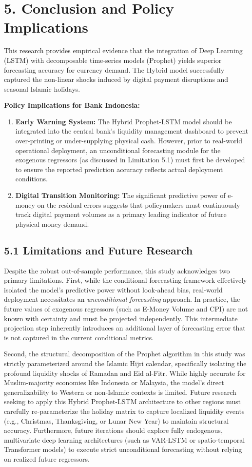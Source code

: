 \documentclass[12pt, letterpaper]{article}
\begin{document}
\section*{5. Conclusion and Policy Implications}
This research provides empirical evidence that the integration of Deep Learning (LSTM) with decomposable time-series models (Prophet) yields superior forecasting accuracy for currency demand. The Hybrid model successfully captured the non-linear shocks induced by digital payment disruptions and seasonal Islamic holidays. 

\textbf{Policy Implications for Bank Indonesia:}
\begin{enumerate}
    \item \textbf{Early Warning System:} The Hybrid Prophet-LSTM model should be integrated into the central bank's liquidity management dashboard to prevent over-printing or under-supplying physical cash. However, prior to real-world operational deployment, an unconditional forecasting module for the exogenous regressors (as discussed in Limitation 5.1) must first be developed to ensure the reported prediction accuracy reflects actual deployment conditions.
    \item \textbf{Digital Transition Monitoring:} The significant predictive power of e-money on the residual errors suggests that policymakers must continuously track digital payment volumes as a primary leading indicator of future physical money demand.
\end{enumerate}

\subsection*{5.1 Limitations and Future Research}
Despite the robust out-of-sample performance, this study acknowledges two primary limitations. First, while the conditional forecasting framework effectively isolated the model's predictive power without look-ahead bias, real-world deployment necessitates an \textit{unconditional forecasting} approach. In practice, the future values of exogenous regressors (such as E-Money Volume and CPI) are not known with certainty and must be projected independently. This intermediate projection step inherently introduces an additional layer of forecasting error that is not captured in the current conditional metrics.

Second, the structural decomposition of the Prophet algorithm in this study was strictly parameterized around the Islamic Hijri calendar, specifically isolating the profound liquidity shocks of Ramadan and Eid al-Fitr. While highly accurate for Muslim-majority economies like Indonesia or Malaysia, the model's direct generalizability to Western or non-Islamic contexts is limited. Future research seeking to apply this Hybrid Prophet-LSTM architecture to other regions must carefully re-parameterize the holiday matrix to capture localized liquidity events (e.g., Christmas, Thanksgiving, or Lunar New Year) to maintain structural accuracy. Furthermore, future iterations should explore fully endogenous, multivariate deep learning architectures (such as VAR-LSTM or spatio-temporal Transformer models) to execute strict unconditional forecasting without relying on realized future regressors.
\end{document}

